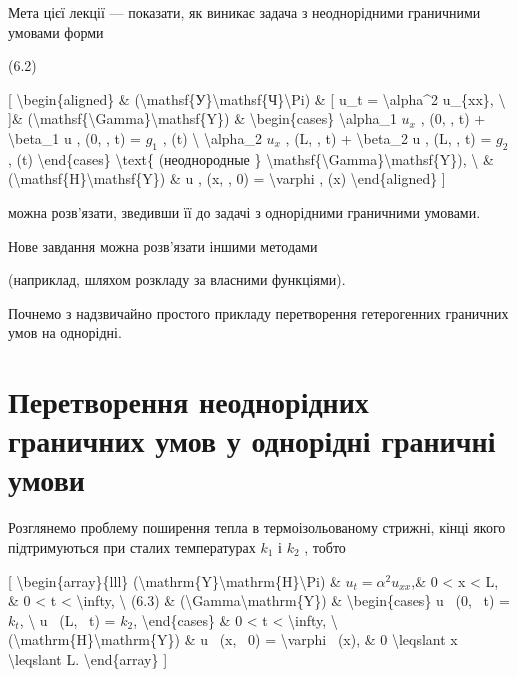 \documentclass[
]{article}
\begin{document}
{Мета цієї лекції --- показати, як виникає задача з неоднорідними
граничними умовами форми

(6.2)

{[} \textbackslash begin\{aligned\} \&
(\textbackslash mathsf\{У\}\textbackslash mathsf\{Ч\}\textbackslash Pi)
\& {[} u\_t = \textbackslash alpha\^{}2 u\_\{xx\}, \textbackslash{}
{]}\&
(\textbackslash mathsf\{\textbackslash Gamma\}\textbackslash mathsf\{Y\})
\& \textbackslash begin\{cases\} \textbackslash alpha\_1 \(u_x\) , (0, ,
t) + \textbackslash beta\_1 u , (0, , t) = \(g_1\) , (t)
\textbackslash{} \textbackslash alpha\_2 \(u_x\) , (L, , t) +
\textbackslash beta\_2 u , (L, , t) = \(g_2\) , (t)
\textbackslash end\{cases\} \textbackslash text\{ (неоднородные \}
\textbackslash mathsf\{\textbackslash Gamma\}\textbackslash mathsf\{Y\}),
\textbackslash{} \&
(\textbackslash mathsf\{H\}\textbackslash mathsf\{Y\}) \& u , (x, , 0) =
\textbackslash varphi , (x) \textbackslash end\{aligned\} {]}

можна розв'язати, зведивши її до задачі з однорідними граничними
умовами.

Нове завдання можна розв'язати іншими методами

(наприклад, шляхом розкладу за власними функціями).

Почнемо з надзвичайно простого прикладу перетворення гетерогенних
граничних умов на однорідні.

\section{Перетворення неоднорідних граничних умов у однорідні граничні
умови}\label{ux43fux435ux440ux435ux442ux432ux43eux440ux435ux43dux43dux44f-ux43dux435ux43eux434ux43dux43eux440ux456ux434ux43dux438ux445-ux433ux440ux430ux43dux438ux447ux43dux438ux445-ux443ux43cux43eux432-ux443-ux43eux434ux43dux43eux440ux456ux434ux43dux456-ux433ux440ux430ux43dux438ux447ux43dux456-ux443ux43cux43eux432ux438}

Розглянемо проблему поширення тепла в термоізольованому стрижні, кінці
якого підтримуються при сталих температурах \(k_1\) і \(k_2\) , тобто

{[} \textbackslash begin\{array\}\{lll\}
(\textbackslash mathrm\{Y\}\textbackslash mathrm\{H\}\textbackslash Pi)
\& \(u_t = \alpha^2 u_{xx}\),\& 0 \textless{} x \textless{} L, \& 0
\textless{} t \textless{} \textbackslash infty, \textbackslash{} (6.3)
\& (\textbackslash Gamma\textbackslash mathrm\{Y\}) \&
\textbackslash begin\{cases\} u ~(0, ~t) = \(k_t\), \textbackslash{} u
~(L, ~t) = \(k_2\), \textbackslash end\{cases\} \& 0 \textless{} t
\textless{} \textbackslash infty, \textbackslash{}
(\textbackslash mathrm\{H\}\textbackslash mathrm\{Y\}) \& u ~(x, ~0) =
\textbackslash varphi ~(x), \& 0 \textbackslash leqslant x
\textbackslash leqslant L. \textbackslash end\{array\} {]}

}
\end{document}
